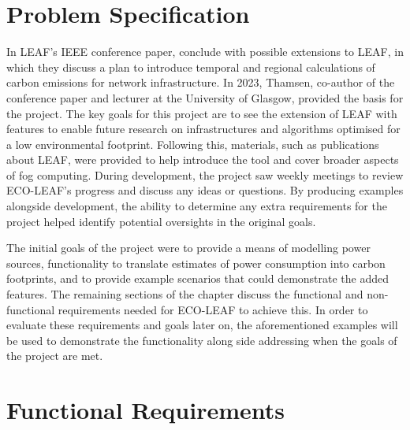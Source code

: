 \documentclass{l4proj}
\begin{document}
\section{Problem Specification}
In LEAF's IEEE conference paper, \cite{leaf2021} conclude with possible extensions to LEAF, in which they discuss a plan to introduce temporal and regional calculations of carbon emissions for network infrastructure.
In 2023, Thamsen, co-author of the conference paper and lecturer at the University of Glasgow, provided the basis for the project.
The key goals for this project are to see the extension of LEAF with features to enable future research on infrastructures and algorithms optimised for a low environmental footprint.
Following this, materials, such as publications about LEAF, were provided to help introduce the tool and cover broader aspects of fog computing.
During development, the project saw weekly meetings to review ECO-LEAF's progress and discuss any ideas or questions.
By producing examples alongside development, the ability to determine any extra requirements for the project helped identify potential oversights in the original goals.

The initial goals of the project were to provide a means of modelling power sources, functionality to translate estimates of power consumption into carbon footprints, and to provide example scenarios that could demonstrate the added features.
The remaining sections of the chapter discuss the functional and non-functional requirements needed for ECO-LEAF to achieve this.
In order to evaluate these requirements and goals later on, the aforementioned examples will be used to demonstrate the functionality along side addressing when the goals of the project are met.
%
\section{Functional Requirements}
\end{document}
